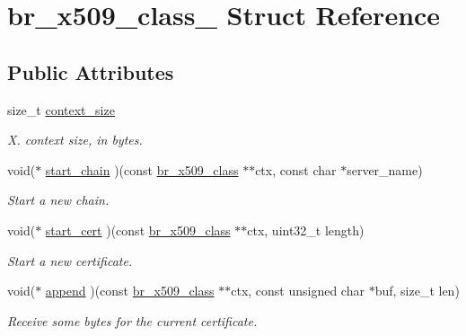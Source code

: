 \hypertarget{structbr__x509__class__}{}\section{br\+\_\+x509\+\_\+class\+\_\+ Struct Reference}
\label{structbr__x509__class__}
\subsection*{Public Attributes}
\begin{DoxyCompactItemize}
\item 
\mbox{\label{structbr__x509__class___a93c4a22bc7c439b5e32033d561b5fe85}} 
size\+\_\+t \hyperlink{structbr__x509__class___a93c4a22bc7c439b5e32033d561b5fe85}{context\+\_\+size}
\begin{DoxyCompactList}\small\item\em X. context size, in bytes. \end{DoxyCompactList}\item 
void($\ast$ \hyperlink{structbr__x509__class___a61fcfd55c81fd2d32edeedd64714c7e2}{start\+\_\+chain} )(const \hyperlink{bearssl__x509_8h_acf3af5c1ad4007b178e4c6d68ce5bb0d}{br\+\_\+x509\+\_\+class} $\ast$$\ast$ctx, const char $\ast$server\+\_\+name)
\begin{DoxyCompactList}\small\item\em Start a new chain. \end{DoxyCompactList}\item 
void($\ast$ \hyperlink{structbr__x509__class___a7f09733a83c0badbb24128d26440ff55}{start\+\_\+cert} )(const \hyperlink{bearssl__x509_8h_acf3af5c1ad4007b178e4c6d68ce5bb0d}{br\+\_\+x509\+\_\+class} $\ast$$\ast$ctx, uint32\+\_\+t length)
\begin{DoxyCompactList}\small\item\em Start a new certificate. \end{DoxyCompactList}\item 
void($\ast$ \hyperlink{structbr__x509__class___a132f22c46f8798f0e2cce6d14b49140d}{append} )(const \hyperlink{bearssl__x509_8h_acf3af5c1ad4007b178e4c6d68ce5bb0d}{br\+\_\+x509\+\_\+class} $\ast$$\ast$ctx, const unsigned char $\ast$buf, size\+\_\+t len)
\begin{DoxyCompactList}\small\item\em Receive some bytes for the current certificate. \end{DoxyCompactList}\item 
$$
\end{DoxyCompactItemize}
